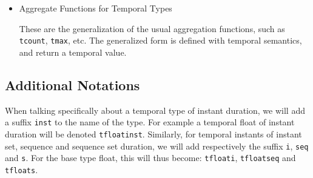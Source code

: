\begin{itemize}
    \item Aggregate Functions for Temporal Types

        These are the generalization of the usual aggregation functions, such as \lstinline{tcount}, \lstinline{tmax}, etc. The generalized form is defined with temporal semantics, and return a temporal value.

\end{itemize}

\subsection{Additional Notations}
\label{section:mobilitydb_notations}

When talking specifically about a temporal type of instant duration, we will add a suffix \lstinline{inst} to the name of the type. For example a temporal float of instant duration will be denoted \lstinline{tfloatinst}. 
Similarly, for temporal instants of instant set, sequence and sequence set duration, we will add respectively the suffix \lstinline{i}, \lstinline{seq} and \lstinline{s}. For the base type float, this will thus become: \lstinline{tfloati}, \lstinline{tfloatseq} and \lstinline{tfloats}.